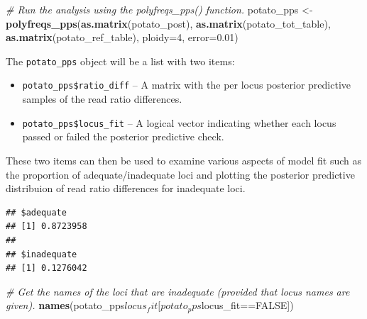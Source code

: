 \documentclass[]{article}
\newenvironment{Shaded}{\begin{snugshade}}{\end{snugshade}}
\newcommand{\KeywordTok}[1]{\textcolor[rgb]{0.13,0.29,0.53}{\textbf{{#1}}}}
\newcommand{\DataTypeTok}[1]{\textcolor[rgb]{0.13,0.29,0.53}{{#1}}}
\newcommand{\DecValTok}[1]{\textcolor[rgb]{0.00,0.00,0.81}{{#1}}}
\newcommand{\FloatTok}[1]{\textcolor[rgb]{0.00,0.00,0.81}{{#1}}}
\newcommand{\StringTok}[1]{\textcolor[rgb]{0.31,0.60,0.02}{{#1}}}
\newcommand{\CommentTok}[1]{\textcolor[rgb]{0.56,0.35,0.01}{\textit{{#1}}}}
\newcommand{\OtherTok}[1]{\textcolor[rgb]{0.56,0.35,0.01}{{#1}}}
\newcommand{\NormalTok}[1]{{#1}}
\begin{document}
\begin{Shaded}
\begin{Highlighting}[]
\CommentTok{# Run the analysis using the polyfreqs_pps() function.}
\NormalTok{potato_pps <-}\StringTok{ }\KeywordTok{polyfreqs_pps}\NormalTok{(}\KeywordTok{as.matrix}\NormalTok{(potato_post), }
                            \KeywordTok{as.matrix}\NormalTok{(potato_tot_table), }
                            \KeywordTok{as.matrix}\NormalTok{(potato_ref_table), }
                            \DataTypeTok{ploidy=}\DecValTok{4}\NormalTok{, }\DataTypeTok{error=}\FloatTok{0.01}\NormalTok{)}
\end{Highlighting}
\end{Shaded}

The \texttt{potato\_pps} object will be a list with two items:

\begin{itemize}
\item
  \texttt{potato\_pps\$ratio\_diff} -- A matrix with the per locus
  posterior predictive samples of the read ratio differences.
\item
  \texttt{potato\_pps\$locus\_fit} -- A logical vector indicating
  whether each locus passed or failed the posterior predictive check.
\end{itemize}

These two items can then be used to examine various aspects of model fit
such as the proportion of adequate/inadequate loci and plotting the
posterior predictive distribuion of read ratio differences for
inadequate loci.

\begin{Shaded}
\end{Shaded}

\begin{verbatim}
## $adequate
## [1] 0.8723958
## 
## $inadequate
## [1] 0.1276042
\end{verbatim}

\begin{Shaded}
\begin{Highlighting}[]
\CommentTok{# Get the names of the loci that are inadequate (provided that locus names are given).}
\KeywordTok{names}\NormalTok{(potato_pps$locus_fit[potato_pps$locus_fit==}\OtherTok{FALSE}\NormalTok{])}
\end{Highlighting}
\end{Shaded}
\end{document}
